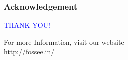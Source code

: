 \documentclass[presentation]{beamer}
\begin{document}
\begin{frame}
\frametitle{Acknowledgement}
\label{sec-14}

  \begin{block}{}
  \begin{center}
  \textcolor{blue}{\Large THANK YOU!} 
  \end{center}
  \end{block}
\begin{block}{}
  \begin{center}
    For more Information, visit our website\\
    \url{http://fossee.in/}
  \end{center}  
  \end{block}
\end{frame}
\end{document}

